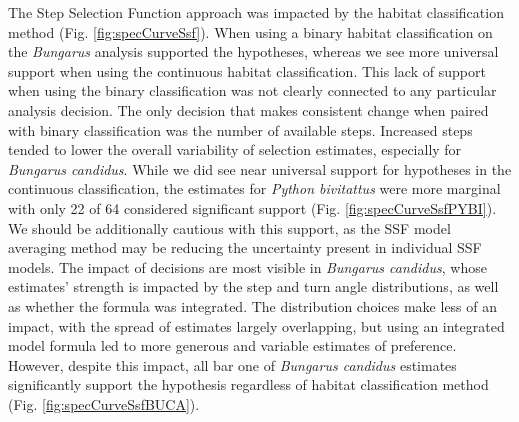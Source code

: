 \documentclass[10pt,a4paper]{article}
\begin{document}
The Step Selection Function approach was impacted by the habitat classification method (Fig. \ref{fig:specCurveSsf}).
When using a binary habitat classification on the \emph{Bungarus} analysis supported the hypotheses, whereas we see more universal support when using the continuous habitat classification.
This lack of support when using the binary classification was not clearly connected to any particular analysis decision.
The only decision that makes consistent change when paired with binary classification was the number of available steps.
Increased steps tended to lower the overall variability of selection estimates, especially for \emph{Bungarus candidus}.
While we did see near universal support for hypotheses in the continuous classification, the estimates for \emph{Python bivitattus} were more marginal with only 22 of 64 considered significant support (Fig. \ref{fig:specCurveSsfPYBI}).
We should be additionally cautious with this support, as the SSF model averaging method may be reducing the uncertainty present in individual SSF models.
The impact of decisions are most visible in \emph{Bungarus candidus}, whose estimates' strength is impacted by the step and turn angle distributions, as well as whether the formula was integrated.
The distribution choices make less of an impact, with the spread of estimates largely overlapping, but using an integrated model formula led to more generous and variable estimates of preference.
However, despite this impact, all bar one of \emph{Bungarus candidus} estimates significantly support the hypothesis regardless of habitat classification method (Fig. \ref{fig:specCurveSsfBUCA}).
\end{document}
